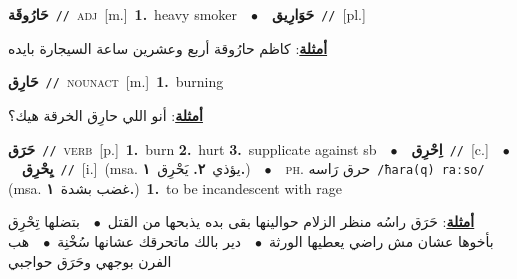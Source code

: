 \documentclass[10pt,a4paper,twoside]{article} %
\begin{document}
\begin{multicols}{2}
{\setlength\topsep{0pt}\textbf{\foreignlanguage{arabic}{حَارُوقَة}}\ {\color{gray}\texttt{//}\color{black}}\ \textsc{adj}\ [m.]\ \textbf{1.}~heavy smoker\ \ $\bullet$\ \ \setlength\topsep{0pt}\textbf{\foreignlanguage{arabic}{حَوَارِيق}}\ {\color{gray}\texttt{//}\color{black}}\ [pl.]\  \begin{flushright}\color{gray}\foreignlanguage{arabic}{\textbf{\underline{\foreignlanguage{arabic}{أمثلة}}}: كاظم حارُوقة أربع وعشرين ساعة السيجارة بايده}\end{flushright}\color{black}} \vspace{2mm}

{\setlength\topsep{0pt}\textbf{\foreignlanguage{arabic}{حَارِق}}\ {\color{gray}\texttt{//}\color{black}}\ \textsc{noun\textunderscore act}\ [m.]\ \textbf{1.}~burning\  \begin{flushright}\color{gray}\foreignlanguage{arabic}{\textbf{\underline{\foreignlanguage{arabic}{أمثلة}}}: أنو اللي حارِق الخرقة هيك؟}\end{flushright}\color{black}} \vspace{2mm}

{\setlength\topsep{0pt}\textbf{\foreignlanguage{arabic}{حَرَق}}\ {\color{gray}\texttt{//}\color{black}}\ \textsc{verb}\ [p.]\ \textbf{1.}~burn  \textbf{2.}~hurt  \textbf{3.}~supplicate against sb\ \ $\bullet$\ \ \setlength\topsep{0pt}\textbf{\foreignlanguage{arabic}{اِحْرِق}}\ {\color{gray}\texttt{//}\color{black}}\ [c.]\ \ $\bullet$\ \ \setlength\topsep{0pt}\textbf{\foreignlanguage{arabic}{يِحْرِق}}\ {\color{gray}\texttt{//}\color{black}}\ [i.]\ \color{gray}(msa. \foreignlanguage{arabic}{يؤذي}~\foreignlanguage{arabic}{\textbf{٢.}}  \foreignlanguage{arabic}{يَحْرِق}~\foreignlanguage{arabic}{\textbf{١.}})\color{black}\ \ $\bullet$\ \ \textsc{ph.} \color{gray} \foreignlanguage{arabic}{حرق رَاسه}\color{black}\ {\color{gray}\texttt{/{\sffamily ħara(q) raːso}/}\color{black}}\ \color{gray} (msa. \foreignlanguage{arabic}{غضب بشدة}~\foreignlanguage{arabic}{\textbf{١.}})\color{black}\ \textbf{1.}~to be incandescent with rage\  \begin{flushright}\color{gray}\foreignlanguage{arabic}{\textbf{\underline{\foreignlanguage{arabic}{أمثلة}}}: حَرَق راسُه منظر الزلام حوالينها بقى بده يذبحها من القتل\ $\bullet$\ \  بتضلها تِحْرِق بأخوها عشان مش راضي يعطيها الورثة\ $\bullet$\ \  دير بالك ماتحرقك عشانها سُخْنِة\ $\bullet$\ \  هب الفرن بوجهي وحَرَق حواجبي}\end{flushright}\color{black}} \vspace{2mm}


\end{multicols}
\end{document}
